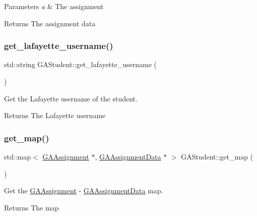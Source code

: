 \begin{DoxyParams}{Parameters}
{\em a} & The assignment \\
\hline
\end{DoxyParams}
\begin{DoxyReturn}{Returns}
The assignment data 
\end{DoxyReturn}
\mbox{\label{class_g_a_student_ad3f1ce3ab268f13812fbf126a2ca018a}} 
\subsubsection{\texorpdfstring{get\+\_\+lafayette\+\_\+username()}{get\_lafayette\_username()}}
{\footnotesize\ttfamily std\+::string G\+A\+Student\+::get\+\_\+lafayette\+\_\+username (\begin{DoxyParamCaption}{ }\end{DoxyParamCaption})}



Get the Lafayette username of the student. 

\begin{DoxyReturn}{Returns}
The Lafayette username 
\end{DoxyReturn}
\mbox{\label{class_g_a_student_a967fe8dc4aac505d1a6dbc8535736681}} 
\subsubsection{\texorpdfstring{get\+\_\+map()}{get\_map()}}
{\footnotesize\ttfamily std\+::map$<$ \hyperlink{class_g_a_assignment}{G\+A\+Assignment} $\ast$, \hyperlink{class_g_a_assignment_data}{G\+A\+Assignment\+Data} $\ast$ $>$ G\+A\+Student\+::get\+\_\+map (\begin{DoxyParamCaption}{ }\end{DoxyParamCaption})}



Get the \hyperlink{class_g_a_assignment}{G\+A\+Assignment} -\/ \hyperlink{class_g_a_assignment_data}{G\+A\+Assignment\+Data} map. 

\begin{DoxyReturn}{Returns}
The map 
\end{DoxyReturn}
\mbox{\label{class_g_a_student_a2424100663a950f60d02b70b00610dde}} 
